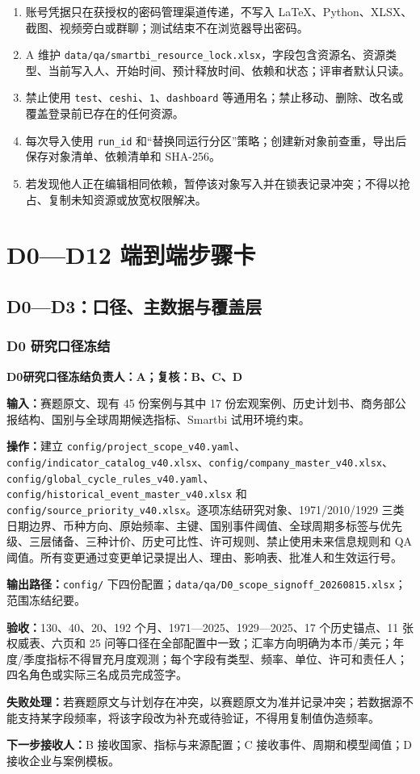 \documentclass[UTF8,fontset=windows,12pt,openany]{ctexbook}
\newcommand{\Field}[1]{{\small\nolinkurl{#1}}}
\newcommand{\File}[1]{{\small\nolinkurl{#1}}}
\newcommand{\StepTitle}[3]{%
  \noindent\colorbox{DeepNavy}{\parbox{0.965\textwidth}{\color{white}\Large\bfseries #1\quad #2\hfill\normalsize #3}}\par\medskip
}
\newcommand{\CardRow}[2]{\noindent\textbf{#1：}#2\par}
\begin{document}
\begin{enumerate}
  \item 账号凭据只在获授权的密码管理渠道传递，不写入 LaTeX、Python、XLSX、截图、视频旁白或群聊；测试结束不在浏览器导出密码。
  \item A 维护 \File{data/qa/smartbi_resource_lock.xlsx}，字段包含资源名、资源类型、当前写入人、开始时间、预计释放时间、依赖和状态；评审者默认只读。
  \item 禁止使用 \Field{test}、\Field{ceshi}、\Field{1}、\Field{dashboard} 等通用名；禁止移动、删除、改名或覆盖登录前已存在的任何资源。
  \item 每次导入使用 \Field{run_id} 和“替换同运行分区”策略；创建新对象前查重，导出后保存对象清单、依赖清单和 SHA-256。
  \item 若发现他人正在编辑相同依赖，暂停该对象写入并在锁表记录冲突；不得以抢占、复制未知资源或放宽权限解决。
\end{enumerate}

\part{D0—D12 端到端步骤卡}

\chapter{D0—D3：口径、主数据与覆盖层}

\section{D0 研究口径冻结}
\StepTitle{D0}{研究口径冻结}{负责人：A；复核：B、C、D}
\CardRow{输入}{赛题原文、现有 45 份案例与其中 17 份宏观案例、历史计划书、商务部公报结构、国别与全球周期候选指标、Smartbi 试用环境约束。}
\CardRow{操作}{建立 \File{config/project_scope_v40.yaml}、\File{config/indicator_catalog_v40.xlsx}、\File{config/company_master_v40.xlsx}、\File{config/global_cycle_rules_v40.yaml}、\File{config/historical_event_master_v40.xlsx} 和 \File{config/source_priority_v40.xlsx}。逐项冻结研究对象、1971/2010/1929 三类日期边界、币种方向、原始频率、主键、国别事件阈值、全球周期多标签与优先级、三层储备、三种计价、历史可比性、许可规则、禁止使用未来信息规则和 QA 阈值。所有变更通过变更单记录提出人、理由、影响表、批准人和生效运行号。}
\CardRow{输出路径}{\File{config/} 下四份配置；\File{data/qa/D0_scope_signoff_20260815.xlsx}；范围冻结纪要。}
\CardRow{验收}{130、40、20、192 个月、1971—2025、1929—2025、17 个历史锚点、11 张权威表、六页和 25 问等口径在全部配置中一致；汇率方向明确为本币/美元；年度/季度指标不得冒充月度观测；每个字段有类型、频率、单位、许可和责任人；四名角色或实际三名成员完成签字。}
\CardRow{失败处理}{若赛题原文与计划存在冲突，以赛题原文为准并记录冲突；若数据源不能支持某字段频率，将该字段改为补充或待验证，不得用复制值伪造频率。}
\CardRow{下一步接收人}{B 接收国家、指标与来源配置；C 接收事件、周期和模型阈值；D 接收企业与案例模板。}
\end{document}
